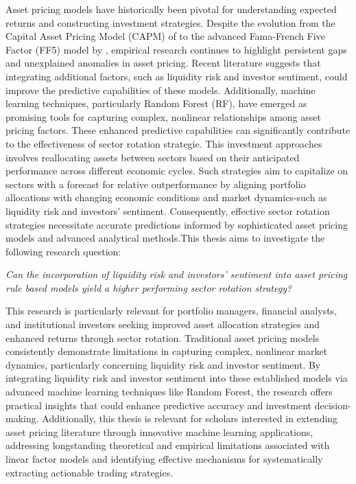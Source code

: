 Asset pricing models have historically been pivotal for understanding expected returns and constructing investment strategies. Despite the evolution from the Capital Asset Pricing Model (CAPM) of  to the advanced Fama-French Five Factor (FF5) model by , empirical research continues to highlight persistent gaps and unexplained anomalies in asset pricing. Recent literature suggests that integrating additional factors, such as liquidity risk and investor sentiment, could improve the predictive capabilities of these models. Additionally, machine learning techniques, particularly Random Forest (RF), have emerged as promising tools for capturing complex, nonlinear relationships among asset pricing factors. These enhanced predictive capabilities can significantly contribute to the effectiveness of sector rotation strategie. This investment approaches involves reallocating assets between sectors based on their anticipated performance across different economic cycles. Such strategies aim to capitalize on sectors with a forecast for relative outperformance by aligning portfolio allocations with changing economic conditions and market dynamics-such as liquidity risk and investors' sentiment. Consequently, effective sector rotation strategies necessitate accurate predictions informed by sophisticated asset pricing models and advanced analytical methods.This thesis aims to investigate the following research question: 

\begin{center}
    \textit{Can the incorporation of liquidity risk and investors' sentiment into asset pricing rule based models yield a higher performing sector rotation strategy?}
\end{center}

This research is particularly relevant for portfolio managers, financial analysts, and institutional investors seeking improved asset allocation strategies and enhanced returns through sector rotation. Traditional asset pricing models consistently demonstrate limitations in capturing complex, nonlinear market dynamics, particularly concerning liquidity risk and investor sentiment. By integrating liquidity risk and investor sentiment into these established models via advanced machine learning techniques like Random Forest, the research offers practical insights that could enhance predictive accuracy and investment decision-making. Additionally, this thesis is relevant for scholars interested in extending asset pricing literature through innovative machine learning applications, addressing longstanding theoretical and empirical limitations associated with linear factor models and identifying effective mechanisms for systematically extracting actionable trading strategies.